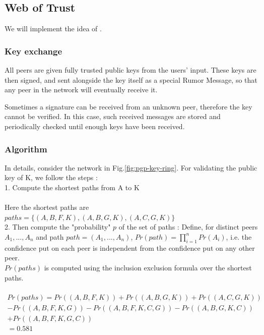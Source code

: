 \documentclass[]{article}
\begin{document}
\subsection{Web of Trust}
\label{sec:web-of-trust-spec}
We will implement the idea of \cite{haenni2007new}.

\subsubsection{Key exchange}

All peers are given fully trusted public keys from the users' input.
These keys are then signed, and sent alongside the key itself as a special Rumor Message, so that any peer in the network will eventually receive it.

Sometimes a signature can be received from an unknown peer, therefore the key cannot be verified. In this case, such received messages are stored and periodically checked until enough keys have been received.

\subsubsection{Algorithm}
\label{sec:wts-algo}
In details, consider the network in Fig.\ref{fig:pgp-key-ring}. For validating the public key of K, we follow the steps : \\

1. Compute the shortest paths from A to K \\\\
Here the shortest paths are $paths = \{(A,B,F,K), (A,B,G,K), (A,C,G,K)\}$\\

2. Then compute the "probability" $p$ of the set of paths : \newline
Define, for distinct peers $A_1,...,A_n$ and path $path = (A_1,...,A_n)$, $Pr(path) = \prod_{i = 1}^{n} Pr(A_i)$, i.e. the confidence put on each peer is independent from the confidence put on any other peer. \\
$Pr(paths)$ is computed using the inclusion exclusion formula over the shortest paths. \\\\


\begin{multline}
Pr(paths) = Pr((A,B,F,K)) + Pr((A,B,G,K)) + Pr((A,C,G,K)) \\
		    - Pr((A,B,F,K,G)) - Pr((A,B,F,K,C,G)) - Pr((A,B,G,K,C)) \\
		    + Pr((A,B,F,K,G,C)) \\
		  = 0.581
\end{multline}
\end{document}
